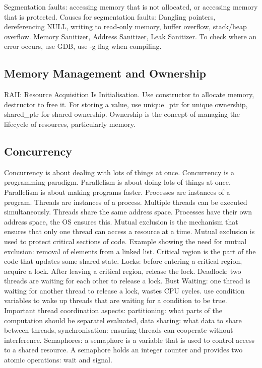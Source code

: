 \documentclass{article}
\begin{document}
Segmentation faults: accessing memory that is not allocated, or accessing memory that is protected.
Causes for segmentation faults: Dangling pointers, dereferencing NULL, writing to read-only memory,
buffer overflow, stack/heap overflow.
Memory Sanitizer, Address Sanitizer, Leak Sanitizer.
To check where an error occurs, use GDB, use -g flag when compiling.

\subsection*{Memory Management and Ownership}

RAII: Resource Acquisition Is Initialisation.
Use constructor to allocate memory, destructor to free it.
For storing a value, use unique\_ptr for unique ownership, shared\_ptr for shared ownership.
Ownership is the concept of managing the lifecycle of resources, particularly memory.


\subsection*{Concurrency}
Concurrency is about dealing with lots of things at once.
Concurrency is a programming paradigm.
Parallelism is about doing lots of things at once.
Parallelism is about making programs faster.
Processes are instances of a program.
Threads are instances of a process.
Multiple threads can be executed simultaneously.
Threads share the same address space.
Processes have their own address space, the OS ensures this.
Mutual exclusion is the mechanism that ensures that only one thread can access a resource at a time.
Mutual exclusion is used to protect critical sections of code.
Example showing the need for mutual exclusion: removal of elements from a linked list.
Critical region is the part of the code that updates some shared state.
Locks: before entering a critical region, acquire a lock.
After leaving a critical region, release the lock.
Deadlock: two threads are waiting for each other to release a lock.
Bust Waiting: one thread is waiting for another thread to release a lock, wastes CPU cycles.
use condition variables to wake up threads that are waiting for a condition to be true.
Important thread coordination aspects: 
partitioning: what parts of the computation should be separatel evaluated,
data sharing: what data to share between threads,
synchronisation: ensuring threads can cooperate without interference.
Semaphores: a semaphore is a variable that is used to control access to a shared resource.
A semaphore holds an integer counter and provides two atomic operations: wait and signal.
\end{document}

